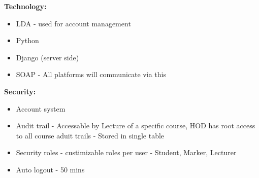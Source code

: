 \documentclass{article}
\begin{document}
\textbf{Technology:}
\begin{itemize}
\item LDA - used for account management
\item Python
\item Django (server side)
\item SOAP - All platforms will communicate via this
\end{itemize}

\textbf{Security:}
\begin{itemize}
\item Account system
\item Audit trail - Accessable by Lecture of a specific course, HOD has root access to all course aduit trails - Stored in single table
\item Security roles - custimizable roles per user - Student, Marker, Lecturer
\item Auto logout - 50 mins
\end{itemize}
\end{document}
